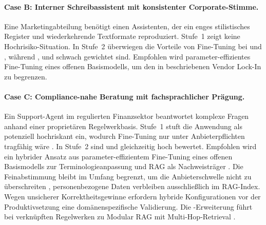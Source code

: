 \paragraph{Case B: Interner Schreibassistent mit konsistenter Corporate-Stimme.}
Eine Marketingabteilung benötigt einen Assistenten, der ein enges stilistisches Register und wiederkehrende Textformate reproduziert. Stufe~1 zeigt keine Hochrisiko-Situation. In Stufe~2 überwiegen die Vorteile von Fine-Tuning bei  und , während ,  und  schwach gewichtet sind. Empfohlen wird parameter-effizientes Fine-Tuning eines offenen Basismodells, um den in  beschriebenen Vendor Lock-In zu begrenzen.

\paragraph{Case C: Compliance-nahe Beratung mit fachsprachlicher Prägung.}
Ein Support-Agent im regulierten Finanzsektor beantwortet komplexe Fragen anhand einer proprietären Regelwerkbasis. Stufe~1 stuft die Anwendung als potenziell hochriskant ein, wodurch Fine-Tuning nur unter Anbieterpflichten tragfähig wäre \autocite[Art.~25 Abs.~1]{EuropaischesParlamentundRat.2024}. In Stufe~2 sind  und  gleichzeitig hoch bewertet. Empfohlen wird ein hybrider Ansatz aus parameter-effizientem Fine-Tuning eines offenen Basismodells zur Terminologieanpassung und RAG als Nachweisträger \autocite[14]{Gao.2024}. Die Feinabstimmung bleibt im Umfang begrenzt, um die Anbieterschwelle nicht zu überschreiten \autocite[Rn.~61]{EuropeanCommission.2025}, personenbezogene Daten verbleiben ausschließlich im RAG-Index. Wegen unsicherer Korrektheitsgewinne \autocite[7]{Ovadia.2024} erfordern hybride Konfigurationen vor der Produktivsetzung eine domänenspezifische Validierung. Die -Erweiterung führt bei verknüpften Regelwerken zu Modular RAG mit Multi-Hop-Retrieval \autocite[11]{Gao.2024}.
